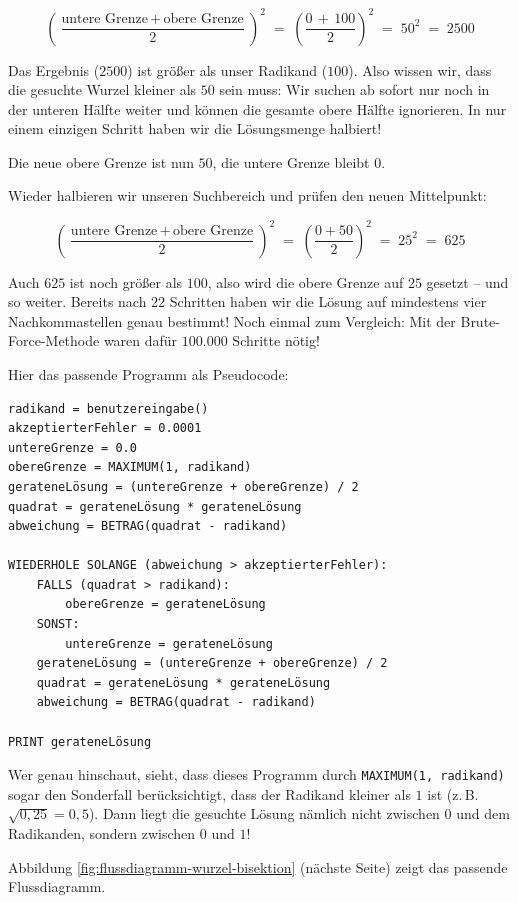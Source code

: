 \[
\left(\frac{\textrm{untere Grenze} \,+\, \textrm{obere Grenze}}{2}\right)^2 \; =
\; \left(\frac{0 \,+\, 100}{2}\right)^2 \;=\; 50^2 \;=\; 2500
\]

Das Ergebnis ($2500$) ist größer als unser Radikand ($100$). Also wissen wir,
dass die gesuchte Wurzel kleiner als $50$ sein muss: Wir suchen ab sofort nur
noch in der unteren Hälfte weiter und können die gesamte obere Hälfte ignorieren.
In nur einem einzigen Schritt haben wir die Lösungsmenge halbiert!

Die neue obere Grenze ist nun $50$, die untere Grenze bleibt $0$.

Wieder halbieren wir unseren Suchbereich und prüfen den neuen Mittelpunkt:

\[
\left(\frac{\textrm{untere Grenze} \,+\, \textrm{obere Grenze}}{2}\right)^2 \; =
\; \left(\frac{0 + 50}{2}\right)^2 \;=\; 25^2 \;=\; 625
\]

Auch $625$ ist noch größer als $100$, also wird die obere Grenze auf $25$
gesetzt -- und so weiter. Bereits nach $22$ Schritten haben wir die Lösung
auf mindestens vier Nachkommastellen genau bestimmt! Noch einmal zum Vergleich:
Mit der Brute-Force-Methode waren dafür $100.000$ Schritte nötig!

\pagebreak

Hier das passende Programm als Pseudocode:

\begin{lstlisting}
radikand = benutzereingabe()
akzeptierterFehler = 0.0001
untereGrenze = 0.0
obereGrenze = MAXIMUM(1, radikand)
gerateneLösung = (untereGrenze + obereGrenze) / 2
quadrat = gerateneLösung * gerateneLösung
abweichung = BETRAG(quadrat - radikand)

WIEDERHOLE SOLANGE (abweichung > akzeptierterFehler):
    FALLS (quadrat > radikand):
        obereGrenze = gerateneLösung
    SONST:
        untereGrenze = gerateneLösung
    gerateneLösung = (untereGrenze + obereGrenze) / 2
    quadrat = gerateneLösung * gerateneLösung
    abweichung = BETRAG(quadrat - radikand)

PRINT gerateneLösung
\end{lstlisting}

Wer genau hinschaut, sieht, dass dieses Programm durch \lstinline|MAXIMUM(1, radikand)|
sogar den Sonderfall berücksichtigt, dass der Radikand kleiner als $1$ ist (z.\,B.\
$\sqrt{0{,}25} = 0{,}5$). Dann liegt die gesuchte Lösung nämlich nicht zwischen
$0$ und dem Radikanden, sondern zwischen $0$ und $1$!

Abbildung \ref{fig:flussdiagramm-wurzel-bisektion} (nächste Seite) zeigt das
passende Flussdiagramm.

